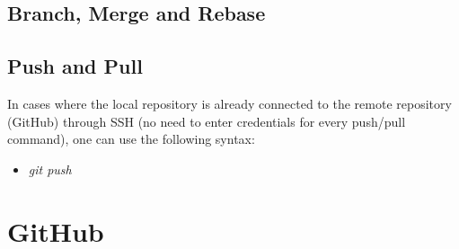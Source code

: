 \documentclass{article}
\begin{document}
\subsection{Branch, Merge and Rebase}


\subsection{Push and Pull}

In cases where the local repository is already connected to the remote repository (GitHub) through SSH (no need to enter credentials for every push/pull command), one can use the following syntax:

\begin{itemize}
    \item \textit{git push} 
\end{itemize}

\section{GitHub}
\end{document}
